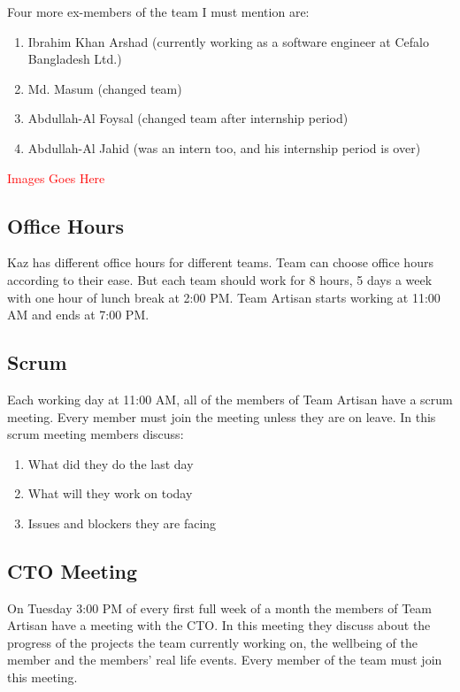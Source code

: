 Four more ex-members of the team I must mention are:

\begin{enumerate}
    \item Ibrahim Khan Arshad (currently working as a software engineer at Cefalo Bangladesh Ltd.)
    \item Md. Masum (changed team)
    \item Abdullah-Al Foysal (changed team after internship period)
    \item Abdullah-Al Jahid (was an intern too, and his internship period is over)
\end{enumerate}

\textcolor{red}{\LARGE Images Goes Here}

\subsection{Office Hours}

Kaz has different office hours for different teams.
Team can choose office hours according to their ease.
But each team should work for 8 hours, 5 days a week with one hour of lunch break at 2:00 PM.
Team Artisan starts working at 11:00 AM and ends at 7:00 PM.

\subsection{Scrum}

Each working day at 11:00 AM, all of the members of Team Artisan have a scrum meeting.
Every member must join the meeting unless they are on leave.
In this scrum meeting members discuss:

\begin{enumerate}
    \item What did they do the last day
    \item What will they work on today
    \item Issues and blockers they are facing
\end{enumerate}

\subsection{CTO Meeting}

On Tuesday 3:00 PM of every first full week of a month the members of Team Artisan have a meeting with the CTO.
In this meeting they discuss about the progress of the projects the team currently working on, the wellbeing of the member and the members' real life events.
Every member of the team must join this meeting.

